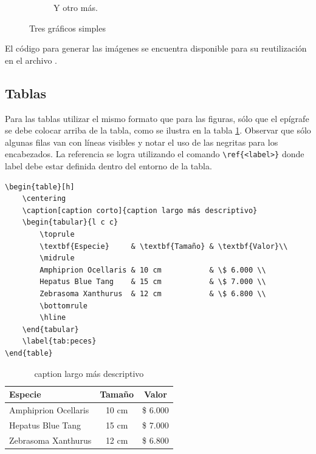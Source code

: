 \begin{figure}[!htpb]
\begin{subfigure}[b]{0.3\textwidth}
         \caption{Y otro más.}
         \label{fig:3de3}
     \end{subfigure}
        \caption{Tres gráficos simples}
        \label{fig:three graphs}
\end{figure}

El código para generar las imágenes se encuentra disponible para su reutilización en el archivo .

\subsection{Tablas}

Para las tablas utilizar el mismo formato que para las figuras, sólo que el epígrafe se debe colocar arriba de la tabla, como se ilustra en la tabla \ref{tab:peces}. Observar que sólo algunas filas van con líneas visibles y notar el uso de las negritas para los encabezados.  La referencia se logra utilizando el comando \verb|\ref{<label>}| donde label debe estar definida dentro del entorno de la tabla.

\begin{verbatim}
\begin{table}[h]
	\centering
	\caption[caption corto]{caption largo más descriptivo}
	\begin{tabular}{l c c}    
		\toprule
		\textbf{Especie}     & \textbf{Tamaño} & \textbf{Valor}\\
		\midrule
		Amphiprion Ocellaris & 10 cm           & \$ 6.000 \\		
		Hepatus Blue Tang    & 15 cm           & \$ 7.000 \\
		Zebrasoma Xanthurus  & 12 cm           & \$ 6.800 \\
		\bottomrule
		\hline
	\end{tabular}
	\label{tab:peces}
\end{table}
\end{verbatim}


\begin{table}[h]
	\centering
	\caption[caption corto]{caption largo más descriptivo}
	\begin{tabular}{l c c}    
		\toprule
		\textbf{Especie} 	 & \textbf{Tamaño} 		& \textbf{Valor}  \\
		\midrule
		Amphiprion Ocellaris & 10 cm 				& \$ 6.000 \\		
		Hepatus Blue Tang	 & 15 cm				& \$ 7.000 \\
		Zebrasoma Xanthurus	 & 12 cm				& \$ 6.800 \\
		\bottomrule
		\hline
	\end{tabular}
	\label{tab:peces}
\end{table}

